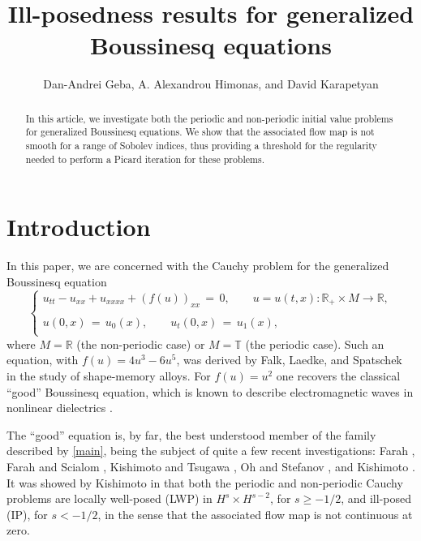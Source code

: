 \documentclass{amsart}
\begin{document}
\title{Ill-posedness results for generalized Boussinesq equations}

\author{Dan-Andrei Geba, A. Alexandrou Himonas, and David Karapetyan}

\address{Department of Mathematics, University of Rochester, Rochester, NY 14627}
\address{Department of Mathematics, University of Notre Dame, Notre Dame, IN 46556}
\address{Department of Mathematics, University of Rochester, Rochester, NY 14627}
\date{}

\begin{abstract}
In this article, we investigate both the periodic and non-periodic initial value problems for generalized Boussinesq equations. We show that the associated flow map is not smooth for a range of Sobolev indices, thus providing a threshold for the regularity needed to perform a Picard iteration for these problems. 
\end{abstract}


\maketitle

\section{Introduction}

In this paper, we are concerned with the Cauchy problem for the generalized Boussinesq equation
\begin{equation}
\left\{
\begin{array}{l}
u_{tt}-u_{xx}+u_{xxxx}+(f(u))_{xx}\,=\,0, \qquad u=u(t,x): \mathbb{R}_+\times M \to \mathbb{R},\\
\\
u(0,x)\,=\,u_0(x),\qquad u_t(0,x)\,=\,u_1(x),\\
\end{array}\right.
\label{main}
\end{equation}
where $M=\mathbb{R}$ (the non-periodic case) or $M=\mathbb{T}$ (the periodic case). Such an  equation, with $f(u)=4u^3-6u^5$, was derived by Falk, Laedke, and Spatschek \cite{FLS} in the study of shape-memory alloys. For $f(u) =  u^{2}$ one recovers the classical ``good'' Boussinesq equation, which is known to describe electromagnetic waves in nonlinear dielectrics \cite{T93}. 

The ``good'' equation is, by far, the best understood member of the family described by \eqref{main}, being the subject of quite a few recent investigations: Farah \cite{F09}, Farah and Scialom \cite{FS10}, Kishimoto and Tsugawa \cite{KT10}, Oh and Stefanov \cite{OS12}, and Kishimoto \cite{K12}. It was showed by Kishimoto in \cite{K12} that both the periodic and non-periodic Cauchy problems are locally well-posed (LWP) in $H^s \times H^{s-2}$, for $s\geq-1/2$, and ill-posed (IP), for $s<-1/2$, in the sense that the associated flow map is not continuous at zero.
\end{document}

